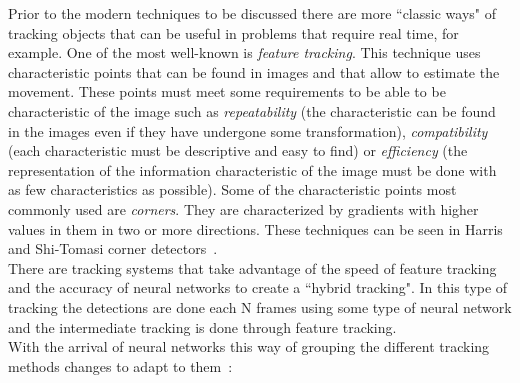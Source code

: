 Prior to the modern techniques to be discussed there are more ``classic ways" of tracking objects that can be useful in problems that require real time, for example. One of the most well-known is \textit{feature tracking}. This technique uses characteristic points that can be found in images and that allow to estimate the movement. These points must meet some requirements to be able to be characteristic of the image such as \textit{repeatability} (the characteristic can be found in the images even if they have undergone some transformation), \textit{compatibility} (each characteristic must be descriptive and easy to find) or \textit{efficiency} (the representation of the information characteristic of the image must be done with as few characteristics as possible). Some of the characteristic points most commonly used are \textit{corners}. They are characterized by gradients with higher values in them in two or more directions. These techniques can be seen in Harris~\cite{harris1988combined} and Shi-Tomasi corner detectors~\cite{shi1994good}.\\
There are tracking systems that take advantage of the speed of feature tracking and the accuracy of neural networks to create a ``hybrid tracking". In this type of tracking the detections are done each N frames using some type of neural network and the intermediate tracking is done through feature tracking.\\
With the arrival of neural networks this way of grouping the different tracking methods changes to adapt to them~\cite{held2016learning}:
